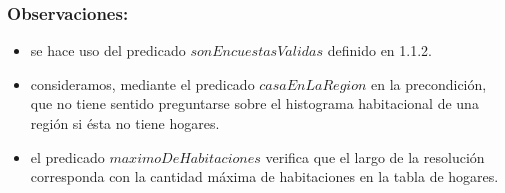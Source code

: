     \subsubsection{Observaciones:}
        \begin{itemize}
            \item se hace uso del predicado $sonEncuestasValidas$ definido en 1.1.2.
            \item consideramos, mediante el predicado $casaEnLaRegion$ en la precondici\'on, que no tiene sentido preguntarse sobre el 
            histograma habitacional de una regi\'on si \'esta no tiene hogares.
            \item el predicado $maximoDeHabitaciones$ verifica que el largo de la resolución corresponda con la cantidad 
            máxima de habitaciones en la tabla de hogares.
        \end{itemize}

